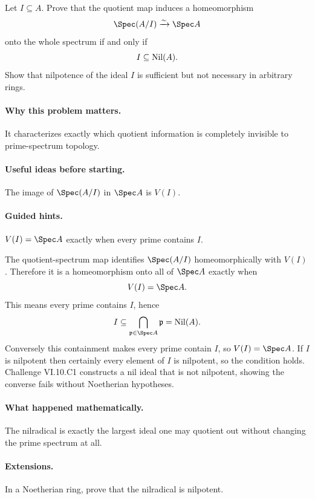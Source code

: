 \begin{problem}
Let $I\subseteq A$.  Prove that the quotient map induces a homeomorphism
\[
\Spec(A/I)\xrightarrow{\sim}\Spec A
\]
onto the whole spectrum if and only if
\[
I\subseteq\operatorname{Nil}(A).
\]
Show that nilpotence of the ideal $I$ is sufficient but not necessary in arbitrary rings.
\end{problem}
\paragraph{Why this problem matters.}
It characterizes exactly which quotient information is completely invisible to prime-spectrum
topology.
\paragraph{Useful ideas before starting.}
The image of $\Spec(A/I)$ in $\Spec A$ is $V(I)$.
\paragraph{Guided hints.}
$V(I)=\Spec A$ exactly when every prime contains $I$.
\begin{solution}
The quotient-spectrum map identifies $\Spec(A/I)$ homeomorphically with $V(I)$.  Therefore
it is a homeomorphism onto all of $\Spec A$ exactly when
\[
V(I)=\Spec A.
\]
This means every prime contains $I$, hence
\[
I\subseteq\bigcap_{\mathfrak p\in\Spec A}\mathfrak p=\Nil(A).
\]
Conversely this containment makes every prime contain $I$, so $V(I)=\Spec A$.
If $I$ is nilpotent then certainly every element of $I$ is nilpotent, so the condition holds.
Challenge VI.10.C1 constructs a nil ideal that is not nilpotent, showing the converse fails
without Noetherian hypotheses.
\end{solution}
\paragraph{What happened mathematically.}
The nilradical is exactly the largest ideal one may quotient out without changing the prime
spectrum at all.
\paragraph{Extensions.}
In a Noetherian ring, prove that the nilradical is nilpotent.
